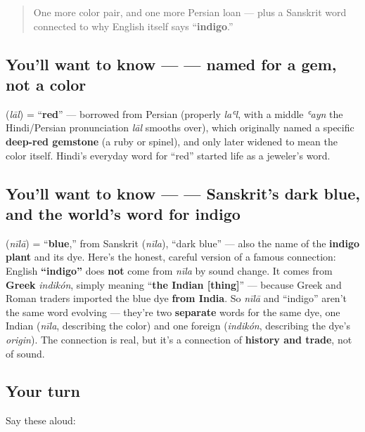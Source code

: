 \label{lesson:HI-C11-laal-niila}



\begin{quote}
One more color pair, and one more Persian loan — plus a Sanskrit word connected to why English itself says \textquotedblleft{}\textbf{indigo}.\textquotedblright{}
\end{quote}

\subsection*{You'll want to know —  — named for a gem, not a color}
\textbf{} (\emph{lāl}) = \textquotedblleft{}\textbf{red}\textquotedblright{} — borrowed from Persian \textbf{} (properly \emph{laʿl}, with a middle \emph{ʿayn} the Hindi/Persian pronunciation \emph{lāl} smooths over), which originally named a specific \textbf{deep-red gemstone} (a ruby or spinel), and only later widened to mean the color itself. Hindi's everyday word for \textquotedblleft{}red\textquotedblright{} started life as a jeweler's word.

\subsection*{You'll want to know —  — Sanskrit's dark blue, and the world's word for indigo}
\textbf{} (\emph{nīlā}) = \textquotedblleft{}\textbf{blue},\textquotedblright{} from Sanskrit \textbf{} (\emph{nīla}), \textquotedblleft{}dark blue\textquotedblright{} — also the name of the \textbf{indigo plant} and its dye. Here's the honest, careful version of a famous connection: English \textbf{\textquotedblleft{}indigo\textquotedblright{}} does \textbf{not} come from \emph{nīla} by sound change. It comes from \textbf{Greek} \emph{indikón}, simply meaning \textquotedblleft{}\textbf{the Indian {[}thing{]}}\textquotedblright{} — because Greek and Roman traders imported the blue dye \textbf{from India}. So \emph{nīlā} and \textquotedblleft{}indigo\textquotedblright{} aren't the same word evolving — they're two \textbf{separate} words for the same dye, one Indian (\emph{nīla}, describing the color) and one foreign (\emph{indikón}, describing the dye's \emph{origin}). The connection is real, but it's a connection of \textbf{history and trade}, not of sound.

\subsection*{Your turn}
Say these aloud:

